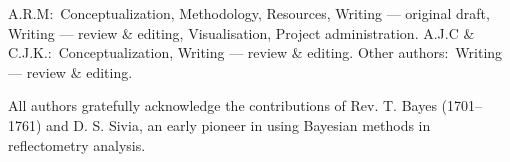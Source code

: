\documentclass[reprint,superscriptaddress,aps,amsmath]{revtex4-2}
\begin{document}
A.R.M:\ Conceptualization, Methodology, Resources, Writing --- original draft, Writing --- review \& editing, Visualisation, Project administration.
A.J.C \& C.J.K.:\ Conceptualization, Writing --- review \& editing.
Other authors:\ Writing --- review \& editing.

\begin{acknowledgments}
    All authors gratefully acknowledge the contributions of Rev. T. Bayes (\numrange{1701}{1761}) and D. S. Sivia, an early pioneer in using Bayesian methods in reflectometry analysis.
\end{acknowledgments}



\end{document}
